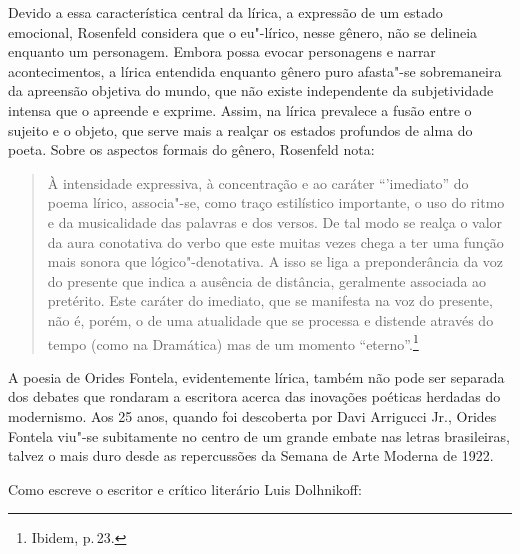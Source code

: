 Devido a essa característica central da lírica, a expressão de um estado emocional, Rosenfeld considera que o eu"-lírico, nesse gênero, não se delineia enquanto um personagem. Embora possa evocar personagens e narrar acontecimentos, a lírica entendida enquanto gênero puro afasta"-se sobremaneira da apreensão objetiva do mundo, que não existe independente da subjetividade intensa que o apreende e exprime. Assim, na lírica prevalece a fusão entre o sujeito e o objeto, que serve mais a realçar os estados profundos de alma do poeta.
Sobre os aspectos formais do gênero, Rosenfeld nota:

\begin{quote}
À intensidade expressiva, à concentração e ao caráter ``'imediato'' do poema lírico, associa"-se, como traço estilístico importante, o uso do ritmo e da musicalidade das palavras e dos versos. De tal modo se realça o valor da aura conotativa do verbo que este muitas vezes chega a ter uma função mais sonora que lógico"-denotativa. A isso se liga a preponderância da voz do presente que indica a ausência de distância, geralmente associada ao pretérito. Este caráter do imediato, que se manifesta na voz do presente, não é, porém, o de uma atualidade que se processa e distende através do tempo (como na Dramática) mas de um momento ``eterno''.\footnote{Ibidem, p.\,23.}
\end{quote}

A poesia de Orides Fontela, evidentemente lírica, também não pode ser separada dos debates que rondaram a escritora acerca das inovações poéticas herdadas do modernismo.
Aos 25 anos, quando foi descoberta por Davi Arrigucci Jr., Orides Fontela viu"-se subitamente no centro de um grande embate nas letras brasileiras, talvez o mais duro desde as repercussões da Semana de Arte Moderna de 1922.

Como escreve o escritor e crítico literário Luis Dolhnikoff:

